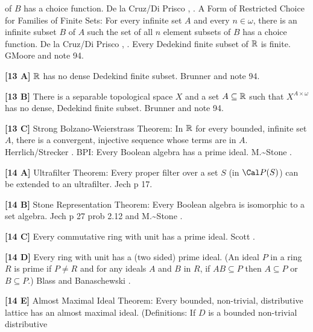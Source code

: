 of $B$ has a choice function. 
\ac{De la Cruz/Di Prisco} \cite{1998a}, \cite{1998b}.
\medskip
{} A Form of
Restricted Choice for Families of Finite Sets:
For every infinite set $A$ and every $n\in\omega$, there is an
infinite subset $B$ of $A$ such the set of all $n$ element subsets of
$B$ has a choice function. 
\ac{De la Cruz/Di Prisco} \cite{1998a}, \cite{1998b}.
\medskip
{} Every Dedekind finite subset of ${\Bbb R}$ is
finite.  G\. \ac{Moore} \cite{1982} and note 94.
\smallskip
\item{}{\bf [13 A]} ${\Bbb R}$ has no dense Dedekind finite subset.
\ac{Brunner} \cite{1982d} and note 94.
\smallskip
\item{}{\bf [13 B]}  There is a separable topological space $X$ and a set
$A\subseteq{\Bbb R}$ such that $X^{A\times\omega }$ has no dense,
Dedekind finite subset. \ac{Brunner} \cite{1982d} and note 94.
\smallskip
\item{}{\bf [13 C]}  Strong Bolzano-Weierstrass Theorem:  In ${\Bbb R}$ for
every bounded, infinite set $A$, there is a convergent, injective sequence
whose terms are in $A$.  \ac{Herrlich/Strecker} \cite{1997}.
\medskip
{} BPI: Every Boolean algebra has a prime ideal.
\ac{M.~Stone} \cite{1936}.
\smallskip
\item{}{\bf [14 A]}  Ultrafilter Theorem:  Every proper filter over a
set $S$ (in ${\Cal P}(S)$) can be extended to an ultrafilter.
\ac{Jech} \cite{1973b} p 17.
\smallskip
\item{}{\bf [14 B]}  Stone Representation Theorem:  Every Boolean  algebra
is isomorphic to a set algebra.  \ac{Jech} \cite{1973b} p 27 prob 2.12 and
\ac{M.~Stone} \cite{1936}. 
\smallskip
\item{}{\bf [14 C]}  Every commutative ring with unit has a  prime  ideal.
\ac{Scott} \cite{1954}.
\smallskip
\item{}{\bf [14 D]}  Every ring with unit has a (two sided)  prime  ideal.
(An ideal $P$ in a ring $R$ is prime if $P \neq  R$  and  for  any
ideals $A$ and $B$ in $R$, if $AB \subseteq  P$ then $A \subseteq  P$ or
$B\subseteq P$.)  \ac{Blass} \cite{1986} and \ac{Banaschewski} \cite{1985}.
\smallskip
\item{}{\bf [14 E]}  Almost Maximal Ideal Theorem:  Every bounded,
non-trivial, distributive lattice has an almost maximal ideal.
(Definitions:  If $D$  is  a  bounded  non-trivial  distributive
